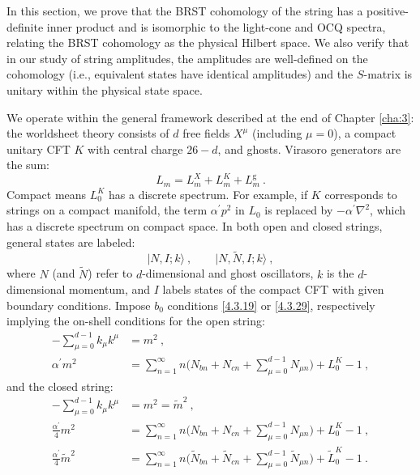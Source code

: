In this section, we prove that the BRST cohomology of the string has a positive-definite inner product and is isomorphic to the light-cone and OCQ spectra, relating the BRST cohomology as the physical Hilbert space. We also verify that in our study of string amplitudes, the amplitudes are well-defined on the cohomology (i.e., equivalent states have identical amplitudes) and the $S$-matrix is unitary within the physical state space.

We operate within the general framework described at the end of Chapter \ref{cha:3}: the worldsheet theory consists of $d$ free fields $X^{\mu}$ (including $\mu=0$), a compact unitary CFT $K$ with central charge $26-d$, and ghosts. Virasoro generators are the sum:
\begin{equation}
L_{m}=L_{m}^{X}+L_{m}^{K}+L_{m}^{\mathrm{g}} \:. \label{4.4.1}
\end{equation}
Compact means $L_{0}^{K}$ has a discrete spectrum. For example, if $K$ corresponds to strings on a compact manifold, the term $\alpha^{\prime} p^{2}$ in $L_{0}$ is replaced by $-\alpha^{\prime} \nabla^{2}$, which has a discrete spectrum on compact space. In both open and closed strings, general states are labeled:
\begin{equation}
|N, I ; k\rangle\:, \qquad|N, \tilde{N}, I ; k\rangle \:, \label{4.4.2}
\end{equation}
where $N$ (and $\tilde{N}$) refer to $d$-dimensional and ghost oscillators, $k$ is the $d$-dimensional momentum, and $I$ labels states of the compact CFT with given boundary conditions. Impose $b_{0}$ conditions \eqref{4.3.19} or \eqref{4.3.29}, respectively implying the on-shell conditions for the open string:
\begin{subequations} \label{4.4.3}
\begin{align}
	-\sum_{\mu=0}^{d-1} k_{\mu} k^{\mu}&=m^{2}  \:, \label{4.4.3a} \\
	\alpha^{\prime} m^{2}&=\sum_{n=1}^{\infty} n\Biggl(N_{b n}+N_{c n}+\sum_{\mu=0}^{d-1} N_{\mu n}\Biggr)+L_{0}^{K}-1 \:, \label{4.4.3b}
\end{align}
\end{subequations}
and the closed string:
\begin{subequations} \label{4.4.4}
\begin{align}
	-\sum_{\mu=0}^{d-1} k_{\mu} k^{\mu}&=m^{2}=\tilde{m}^{2} \:, \label{4.4.4a}\\
	\frac{\alpha^{\prime}}{4} m^{2}&=\sum_{n=1}^{\infty} n\Biggl(N_{b n}+N_{c n}+\sum_{\mu=0}^{d-1} N_{\mu n}\Biggr)+L_{0}^{K}-1 \:, \label{4.4.4b} \\
	\frac{\alpha^{\prime}}{4} \tilde{m}^{2}&=\sum_{n=1}^{\infty} n\Biggl(\tilde{N}_{b n}+\tilde{N}_{c n}+\sum_{\mu=0}^{d-1} \tilde{N}_{\mu n}\Biggr)+\tilde{L}_{0}^{K}-1 \:. \label{4.4.4c}
\end{align}
\end{subequations}
